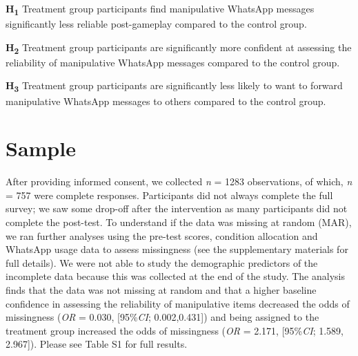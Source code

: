 \documentclass[empirical, authordate]{jote-new-article}
\begin{document}
\textbf{H}\textsubscript{\textbf{1}} Treatment group participants find manipulative \mbox{WhatsApp} messages significantly less reliable post-gameplay compared to the control group.

\textbf{H}\textsubscript{\textbf{2}} Treatment group participants are significantly more confident at assessing the reliability of manipulative \mbox{WhatsApp} messages compared to the control group.

\textbf{H}\textsubscript{\textbf{3}} Treatment group participants are significantly less likely to want to forward manipulative \mbox{WhatsApp} messages to others compared to the control group.

\section{Sample }

After providing informed consent, we collected \emph{n} = 1283 observations, of which, \emph{n} = 757 were complete responses. Participants did not always complete the full survey; we saw some drop-off after the intervention as many participants did not complete the post-test. To understand if the data was missing at random (MAR), we ran further analyses using the pre-test scores, condition allocation and \mbox{WhatsApp} usage data to assess missingness (see the supplementary materials for full details). We were not able to study the demographic predictors of the incomplete data because this was collected at the end of the study. The analysis finds that the data was not missing at random and that a higher baseline confidence in assessing the reliability of manipulative items decreased the odds of missingness (\emph{OR} = 0.030, [95\%\emph{CI}; 0.002,0.431]) and being assigned to the treatment group increased the odds of missingness (\emph{OR} = 2.171, [95\%\emph{CI}; 1.589, 2.967]). Please see Table S1 for full results.
\end{document}
